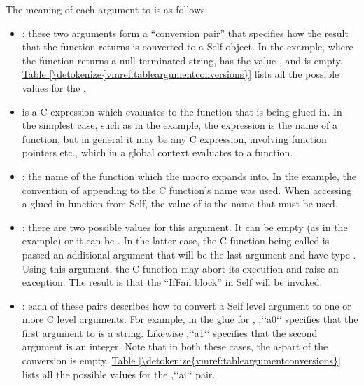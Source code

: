 \documentclass[letterpaper,10pt,english]{sphinxmanual}
\begin{document}
The meaning of each argument to  is as follows:
\begin{itemize}
\item {} 
: these two arguments form a “conversion pair” that specifies how the result that the function returns is converted to a Self object. In the  example, where the function returns a null terminated string,  has the value , and  is empty. \hyperref[\detokenize{vmref:tableargumentconversions}]{Table \ref{\detokenize{vmref:tableargumentconversions}}} lists all the possible values for the .

\item {} 
 is a C expression which evaluates to the function that is being glued in. In the simplest case, such as in the  example, the expression is the name of a function, but in general it may be any C expression, involving function pointers etc., which in a global context evaluates to a function.

\item {} 
: the name of the function which the  macro expands into. In the  example, the convention of appending  to the C function’s name was used. When accessing a glued-in function from Self, the value of  is the name that must be used.

\item {} 
: there are two possible values for this argument. It can be empty (as in the example) or it can be . In the latter case, the C function being called is passed an additional argument that will be the last argument and have type . Using this argument, the C function may abort its execution and raise an exception. The result is that the “IfFail block” in Self will be invoked.

\item {} 
: each of these pairs describes how to convert a Self level argument to one or more C level arguments. For example, in the glue for , ,{}`{}`a0{}`{}` specifies that the first argument to  is a string. Likewise ,{}`{}`a1{}`{}` specifies that the second argument is an integer. Note that in both these cases, the a-part of the conversion is empty. \hyperref[\detokenize{vmref:tableargumentconversions}]{Table \ref{\detokenize{vmref:tableargumentconversions}}} lists all the possible values for the ,{}`{}`ai{}`{}` pair.

\end{itemize}
\end{document}
